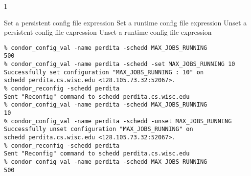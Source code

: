 \begin{ManPage}{\label{man-condor-config-val}}{1}
\begin{Options}
	 { Set a persistent
	config file expression}
	 { Set a runtime
	config file expression}
	 { Unset a persistent
	config file expression}
	 { Unset a runtime
	config file expression}
\end{Options}

\Examples

\begin{verbatim}
% condor_config_val -name perdita -schedd MAX_JOBS_RUNNING
500
% condor_config_val -name perdita -schedd -set MAX_JOBS_RUNNING 10
Successfully set configuration "MAX_JOBS_RUNNING : 10" on 
schedd perdita.cs.wisc.edu <128.105.73.32:52067>.
% condor_reconfig -schedd perdita
Sent "Reconfig" command to schedd perdita.cs.wisc.edu
% condor_config_val -name perdita -schedd MAX_JOBS_RUNNING
10
% condor_config_val -name perdita -schedd -unset MAX_JOBS_RUNNING
Successfully unset configuration "MAX_JOBS_RUNNING" on 
schedd perdita.cs.wisc.edu <128.105.73.32:52067>.
% condor_reconfig -schedd perdita
Sent "Reconfig" command to schedd perdita.cs.wisc.edu
% condor_config_val -name perdita -schedd MAX_JOBS_RUNNING
500
\end{verbatim}


\end{ManPage}
